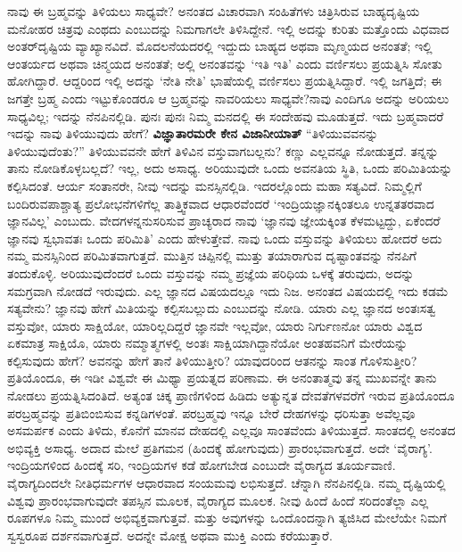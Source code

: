 ನಾವು ಈ ಬ್ರಹ್ಮವನ್ನು ತಿಳಿಯಲು ಸಾಧ್ಯವೇ? ಅನಂತದ ವಿಚಾರವಾಗಿ ಸಂಹಿತೆಗಳು ಚಿತ್ರಿಸಿರುವ ಬಾಹ್ಯದೃಷ್ಟಿಯ ಮನೋಹರ ಚಿತ್ರವು ಎಂಥದು ಎಂಬುದನ್ನು ನಿಮಗಾಗಲೇ ತಿಳಿಸಿದ್ದೇನೆ. ಇಲ್ಲಿ ಅದನ್ನು ಕುರಿತು ಮತ್ತೊಂದು ವಿಧವಾದ ಅಂತರ್​ದೃಷ್ಟಿಯ ವ್ಯಾಖ್ಯಾನವಿದೆ. ಮೊದಲನೆಯದರಲ್ಲಿ ಇದ್ದುದು ಬಾಹ್ಯದ ಅಥವಾ ಮೃಣ್ಮಯದ ಅನಂತತೆ; ಇಲ್ಲಿ ಆಂತರ್ಯದ ಅಥವಾ ಚಿನ್ಮಯದ ಅನಂತತೆ; ಅಲ್ಲಿ ಅನಂತವನ್ನು ‘ಇತಿ ಇತಿ’ ಎಂದು ವರ್ಣಿಸಲು ಪ್ರಯತ್ನಿಸಿ ಸೋತು ಹೋಗಿದ್ದಾರೆ. ಆದ್ದರಿಂದ ಇಲ್ಲಿ ಅದನ್ನು ‘ನೇತಿ ನೇತಿ’ ಭಾಷೆಯಲ್ಲಿ ವರ್ಣಿಸಲು ಪ್ರಯತ್ನಿಸಿದ್ದಾರೆ. ಇಲ್ಲಿ ಜಗತ್ತಿದೆ; ಈ ಜಗತ್ತೇ ಬ್ರಹ್ಮ ಎಂದು ಇಟ್ಟುಕೊಂಡರೂ ಆ ಬ್ರಹ್ಮವನ್ನು ನಾವರಿಯಲು ಸಾಧ್ಯವೇ?ನಾವು ಎಂದಿಗೂ ಅದನ್ನು ಅರಿಯಲು ಸಾಧ್ಯವಿಲ್ಲ; ಇದನ್ನು ನೆನಪಿನಲ್ಲಿಡಿ. ಪುನಃ ಪುನಃ ನಿಮ್ಮ ಮನದಲ್ಲಿ ಈ ಸಂದೇಹವು ಮೂಡುತ್ತದೆ. ಇದು ಬ್ರಹ್ಮವಾದರೆ ಇದನ್ನು ನಾವು ತಿಳಿಯುವುದು ಹೇಗೆ? \textbf{ವಿಜ್ಞಾತಾರಮರೇ ಕೇನ ವಿಜಾನೀಯಾತ್​} “ತಿಳಿಯುವವನನ್ನು ತಿಳಿಯುವುದೆಂತು?” ತಿಳಿಯುವವನೇ ಹೇಗೆ ತಿಳಿವಿನ ವಸ್ತುವಾಗಬಲ್ಲನು? ಕಣ್ಣು ಎಲ್ಲವನ್ನೂ ನೋಡುತ್ತದೆ. ತನ್ನನ್ನು ತಾನು ನೋಡಿಕೊಳ್ಳ\-ಬಲ್ಲದೆ? ಇಲ್ಲ, ಅದು ಅಸಾಧ್ಯ. ಅರಿಯುವುದೇ ಒಂದು ಅವನತಿಯ ಸ್ಥಿತಿ, ಒಂದು ಪರಿಮಿತಿಯನ್ನು ಕಲ್ಪಿಸಿದಂತೆ. ಆರ್ಯ ಸಂತಾನರೇ, ನೀವು ಇದನ್ನು ಮನಸ್ಸಿನಲ್ಲಿಡಿ. ಇದರಲ್ಲೊಂದು ಮಹಾ ಸತ್ಯವಿದೆ. ನಿಮ್ಮಲ್ಲಿಗೆ ಬಂದಿರುವ\break ಪಾಶ್ಚಾತ್ಯ ಪ್ರಲೋಭನೆಗಳಿಗೆಲ್ಲ ತಾತ್ತ್ವಿಕವಾದ ಆಧಾರವೆಂದರೆ ‘ಇಂದ್ರಿಯ\break ಜ್ಞಾನಕ್ಕಿಂತಲೂ ಉನ್ನತತರವಾದ ಜ್ಞಾನವಿಲ್ಲ’ ಎಂಬುದು. ವೇದಗಳನ್ನನುಸರಿಸುವ ಪ್ರಾಚ್ಯರಾದ ನಾವು ‘ಜ್ಞಾನವು ಜ್ಞೇಯಕ್ಕಿಂತ ಕೆಳಮಟ್ಟದ್ದು, ಏಕೆಂದರೆ ಜ್ಞಾನವು ಸ್ವಭಾವತಃ ಒಂದು ಪರಿಮಿತಿ’ ಎಂದು ಹೇಳುತ್ತೇವೆ. ನಾವು ಒಂದು ವಸ್ತುವನ್ನು ತಿಳಿಯಲು ಹೋದರೆ ಅದು ನಮ್ಮ ಮನಸ್ಸಿನಿಂದ ಪರಿಮಿತವಾಗುತ್ತದೆ. ಮುತ್ತಿನ ಚಿಪ್ಪಿನಲ್ಲಿ ಮುತ್ತು ತಯಾರಾಗುವ ದೃಷ್ಟಾಂತವನ್ನು ನೆನಪಿಗೆ ತಂದುಕೊಳ್ಳಿ. ಅರಿಯುವುದೆಂದರೆ ಒಂದು ವಸ್ತುವನ್ನು ನಮ್ಮ ಪ್ರಜ್ಞೆಯ ಪರಿಧಿಯ ಒಳಕ್ಕೆ ತರುವುದು, ಅದನ್ನು ಸಮಗ್ರವಾಗಿ ನೋಡದೆ ಇರುವುದು. ಎಲ್ಲ ಜ್ಞಾನದ ವಿಷಯದಲ್ಲೂ ಇದು ನಿಜ. ಅನಂತದ ವಿಷಯದಲ್ಲಿ ಇದು ಕಡಮೆ ಸತ್ಯವೇನು? ಜ್ಞಾನವು ಹೇಗೆ ಮಿತಿಯನ್ನು ಕಲ್ಪಿಸಬಲ್ಲುದು ಎಂಬುದನ್ನು ನೋಡಿ. ಯಾರು ಎಲ್ಲ ಜ್ಞಾನದ ಅಂತಃಸತ್ವ ವಸ್ತುವೋ, ಯಾರು ಸಾಕ್ಷಿಯೋ, ಯಾರಿಲ್ಲದಿದ್ದರೆ ಜ್ಞಾನವೇ ಇಲ್ಲವೋ, ಯಾರು ನಿರ್ಗುಣನೋ ಯಾರು ವಿಶ್ವದ ಏಕಮಾತ್ರ ಸಾಕ್ಷಿಯೊ, ಯಾರು ನಮ್ಮಾತ್ಮಗಳಲ್ಲಿ ಅಂತಃ ಸಾಕ್ಷಿಯಾಗಿದ್ದಾನೆಯೋ ಅಂತಹವ\-ನಿಗೆ ಮೇರೆಯನ್ನು ಕಲ್ಪಿಸುವುದು ಹೇಗೆ? ಅವನನ್ನು ಹೇಗೆ ತಾನೆ ತಿಳಿಯುತ್ತೀರಿ? ಯಾವುದರಿಂದ ಆತನನ್ನು ಸಾಂತ ಗೊಳಿಸುತ್ತೀರಿ? ಪ್ರತಿಯೊಂದೂ, ಈ ಇಡೀ ವಿಶ್ವವೇ ಈ ಮಿಥ್ಯಾ ಪ್ರಯತ್ನದ ಪರಿಣಾಮ. ಈ ಅನಂತಾತ್ಮವು ತನ್ನ ಮುಖವನ್ನೇ ತಾನು ನೋಡಲು ಪ್ರಯತ್ನಿಸಿದಂತಿದೆ. ಅತ್ಯಂತ ಚಿಕ್ಕ ಪ್ರಾಣಿಗಳಿಂದ ಹಿಡಿದು ಅತ್ಯುನ್ನತ ದೇವತೆಗಳವರೆಗೆ ಇರುವ ಪ್ರತಿಯೊಂದೂ ಪರಬ್ರಹ್ಮವನ್ನು ಪ್ರತಿಬಿಂಬಿಸುವ ಕನ್ನಡಿಗಳಂತೆ. ಪರಬ್ರಹ್ಮವು ಇನ್ನೂ ಬೇರೆ ದೇಹಗಳನ್ನು ಧರಿಸುತ್ತಾ ಅವೆಲ್ಲವೂ ಅಸಮರ್ಪಕ ಎಂದು ತಿಳಿದು, ಕೊನೆಗೆ ಮಾನವ ದೇಹದಲ್ಲಿ ಎಲ್ಲವೂ ಸಾಂತವೆಂದು ತಿಳಿಯುತ್ತದೆ. ಸಾಂತದಲ್ಲಿ ಅನಂತದ ಅಭಿವ್ಯಕ್ತಿ ಅಸಾಧ್ಯ. ಅದಾದ ಮೇಲೆ ಪ್ರತಿಗಮನ (ಹಿಂದಕ್ಕೆ ಹೋಗುವುದು) ಪ್ರಾರಂಭವಾಗುತ್ತದೆ. ಅದೇ ‘ವೈರಾಗ್ಯ’. ಇಂದ್ರಿಯಗಳಿಂದ ಹಿಂದಕ್ಕೆ ಸರಿ, ಇಂದ್ರಿಯಗಳ ಕಡೆ ಹೋಗಬೇಡ ಎಂಬುದೇ ವೈರಾಗ್ಯದ ತೂರ್ಯವಾಣಿ. ವೈರಾಗ್ಯದಿಂದಲೇ ನೀತಿಧರ್ಮಗಳ ಆಧಾರವಾದ ಸಂಯಮವು ಲಭಿಸುತ್ತದೆ. ಚೆನ್ನಾಗಿ ನೆನಪಿನಲ್ಲಿಡಿ. ನಮ್ಮ ದೃಷ್ಟಿಯಲ್ಲಿ ವಿಶ್ವವು ಪ್ರಾರಂಭವಾಗುವುದೇ ತಪಸ್ಸಿನ ಮೂಲಕ, ವೈರಾಗ್ಯದ ಮೂಲಕ. ನೀವು ಹಿಂದೆ ಹಿಂದೆ ಸರಿದಂತೆಲ್ಲಾ ಎಲ್ಲ ರೂಪಗಳೂ ನಿಮ್ಮ ಮುಂದೆ ಅಭಿವ್ಯಕ್ತವಾಗುತ್ತವೆ. ಮತ್ತು ಅವುಗಳನ್ನು ಒಂದೊಂದನ್ನಾಗಿ ತ್ಯಜಿಸಿದ ಮೇಲೆಯೇ ನಿಮಗೆ ಸ್ವಸ್ವರೂಪ ದರ್ಶನವಾಗುತ್ತದೆ. ಅದನ್ನೇ ಮೋಕ್ಷ ಅಥವಾ ಮುಕ್ತಿ ಎಂದು ಕರೆಯುತ್ತಾರೆ.

